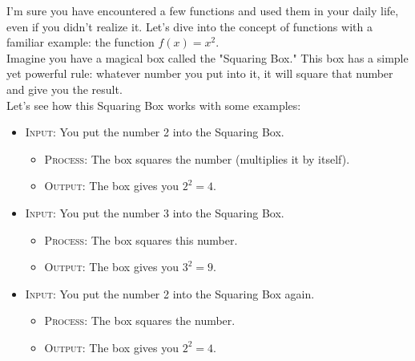 
I'm sure you have encountered a few functions and used them in your daily life, even if you didn't realize it. Let's dive into the concept of functions with a familiar example: the function \( f(x) = x^2 \).\\


Imagine you have a magical box called the "Squaring Box." This box has a simple yet powerful rule: whatever number you put into it, it will square that number and give you the result.\\[2mm]


Let's see how this Squaring Box works with some examples:

\begin{itemize}
    \item \textsc{Input}: You put the number 2 into the Squaring Box.
    \begin{itemize}
        \item \textsc{Process}: The box squares the number (multiplies it by itself).
        \item \textsc{Output}: The box gives you \( 2^2 = 4 \).
    \end{itemize}
    
    \item \textsc{Input}: You put the number 3 into the Squaring Box.
    \begin{itemize}
        \item \textsc{Process}: The box squares this number.
        \item \textsc{Output}: The box gives you \( 3^2 = 9 \).
    \end{itemize}
    
    \item \textsc{Input}: You put the number 2 into the Squaring Box again.
    \begin{itemize}
        \item \textsc{Process}: The box squares the number.
        \item \textsc{Output}: The box gives you \( 2^2 = 4 \).
    \end{itemize}
\end{itemize}

